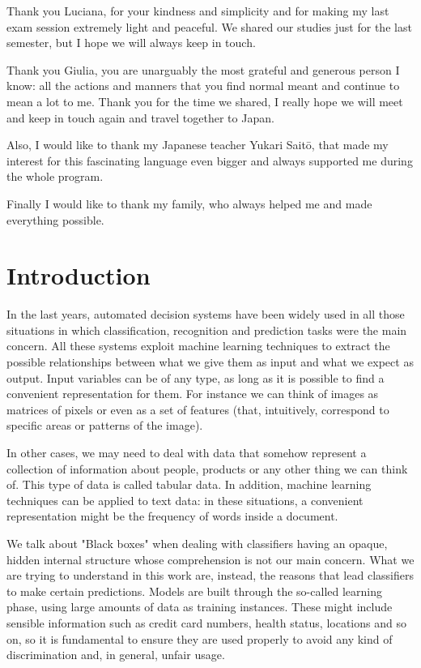 \documentclass[12pt, twoside, a4paper]{report}
\newcommand{\whitepage}{\clearpage
						\thispagestyle{empty}
						\phantom{a}
						\vfill}
\begin{document}
Thank you Luciana, for your kindness and simplicity and for making my last exam session extremely light and peaceful. We shared our studies just for the last semester, but I hope we will always keep in touch. 

Thank you Giulia, you are unarguably the most grateful and generous person I know: all the actions and manners that you find normal meant and continue to mean a lot to me. Thank you for the time we shared, I really hope we will meet and keep in touch again and travel together to Japan.

Also, I would like to thank my Japanese teacher Yukari Saitō, that made my interest for this fascinating language even bigger and always supported me during the whole program. 

Finally I would like to thank my family, who always helped me and made everything possible.

\whitepage
\normalsize
\tableofcontents

\chapter{Introduction}

In the last years, automated decision systems have been widely used in all those situations in which classification, recognition and prediction tasks were the main concern. All these systems exploit machine learning techniques to extract the possible relationships between what we give them as input and what we expect as output. Input variables can be of any type, as long as it is possible to find a convenient representation for them. For instance we can think of images as matrices of pixels or even as a set of features (that, intuitively, correspond to specific areas or patterns of the image). 

In other cases, we may need to deal with data that somehow represent a collection of information about people, products or any other thing we can think of. This type of data is called tabular data. In addition, machine learning techniques can be applied to text data: in these situations, a convenient representation might be the frequency of words inside a document.

We talk about "Black boxes" when dealing with classifiers having an opaque, hidden internal structure whose comprehension is not our main concern. What we are trying to understand in this work are, instead, the reasons that lead classifiers to make certain predictions. Models are built through the so-called learning phase, using large amounts of data as training instances. These might include sensible information such as credit card numbers, health status, locations and so on, so it is fundamental to ensure they are used properly to avoid any kind of discrimination and, in general, unfair usage. 
\end{document}
